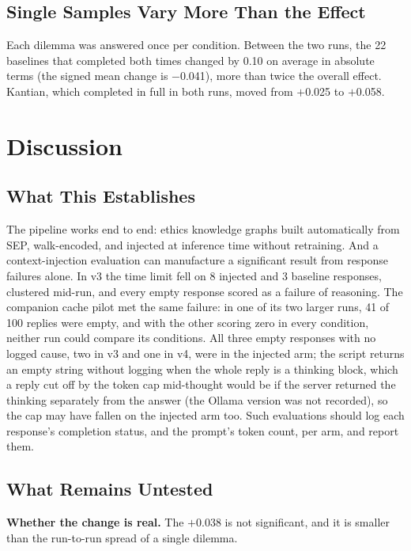 \documentclass[11pt,a4paper]{article}
\begin{document}
\subsection{Single Samples Vary More Than the Effect}

Each dilemma was answered once per condition. Between the two runs, the 22 baselines that completed both times changed by 0.10 on average in absolute terms (the signed mean change is $-$0.041), more than twice the overall effect. Kantian, which completed in full in both runs, moved from $+$0.025 to $+$0.058.

\section{Discussion}

\subsection{What This Establishes}

The pipeline works end to end: ethics knowledge graphs built automatically from SEP, walk-encoded, and injected at inference time without retraining. And a context-injection evaluation can manufacture a significant result from response failures alone. In v3 the time limit fell on 8 injected and 3 baseline responses, clustered mid-run, and every empty response scored as a failure of reasoning. The companion cache pilot \citep{nexus2026kv} met the same failure: in one of its two larger runs, 41 of 100 replies were empty, and with the other scoring zero in every condition, neither run could compare its conditions. All three empty responses with no logged cause, two in v3 and one in v4, were in the injected arm; the script returns an empty string without logging when the whole reply is a thinking block, which a reply cut off by the token cap mid-thought would be if the server returned the thinking separately from the answer (the Ollama version was not recorded), so the cap may have fallen on the injected arm too. Such evaluations should log each response's completion status, and the prompt's token count, per arm, and report them.

\subsection{What Remains Untested}
\label{sec:untested}

\textbf{Whether the change is real.} The $+$0.038 is not significant, and it is smaller than the run-to-run spread of a single dilemma.
\end{document}

